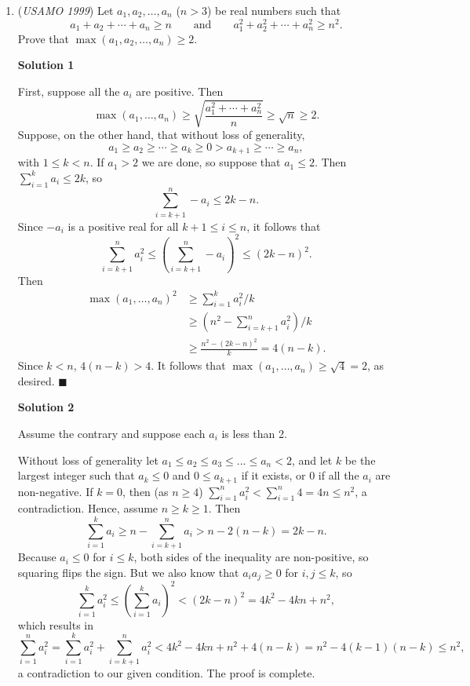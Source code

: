 \begin{enumerate}
 All three possible cases work so we are done.

 (This solution makes absolutely no sense. Why is $k^4\equiv 1$? And how do we know that only $3$ and $5$ work!?)why can't you have a,b,c,d = 2,2,2,4 p = 5 r=1? it doesn't say distinct integers

 


	\item (\textit{USAMO 1999}) Let $a_{1}, a_{2}, \dots, a_{n}$ ($n > 3$) be real numbers such that 
 \[a_{1} + a_{2} + \cdots + a_{n} \geq n \qquad \mbox{and} \qquad a_{1}^{2} + a_{2}^{2} + \cdots + a_{n}^{2} \geq n^{2}.\] Prove that $\max(a_{1}, a_{2}, \dots, a_{n}) \geq 2$.


 



\textbf{Solution 1}

First, suppose all the $a_i$ are positive.  Then
 \[\max(a_1, \dotsc, a_n) \ge \sqrt{\frac{a_1^2 + \dotsb + a_n^2}{n}} \ge \sqrt{n} \ge 2 .\]Suppose, on the other hand, that without loss of generality,
 \[a_1 \ge a_2 \ge \dotsb \ge a_k \ge 0 > a_{k+1} \ge \dotsb \ge a_n,\]with $1\le k <n$.  If $a_1 >2$ we are done, so suppose that $a_1 \le2$.  Then$\sum_{i=1}^k a_i \le 2k$, so 
 \[\sum_{i=k+1}^n -a_i \le 2k-n .\]Since $-a_i$ is a positive real for all $k+1 \le i \le n$, it follows that
 \[\sum_{i=k+1}^n a_i^2 \le \left( \sum_{i=k+1}^n-a_i \right)^2 \le (2k-n)^2 .\]Then
 \begin{align*} \max(a_1, \dotsc, a_n)^2 &\ge \sum_{i=1}^k a_i^2 /k \\ &\ge \left( n^2 - \sum_{i=k+1}^n a_i^2 \right)/k \\ &\ge \frac{n^2 - (2k-n)^2}{k} = 4(n-k). \end{align*}
Since $k<n$, $4(n-k) > 4$.  It follows that $\max(a_1, \dotsc, a_n) \ge \sqrt{4} = 2$, as desired.  $\blacksquare$




\textbf{Solution 2}

Assume the contrary and suppose each $a_i$ is less than 2.

 Without loss of generality let $a_1 \le a_2 \le a_3 \le ... \le a_n < 2$, and let $k$ be the largest integer such that $a_k \le 0$ and $0 \le a_{k+1}$ if it exists, or 0 if all the $a_i$ are non-negative. If $k = 0$, then (as $n \ge 4$) $\sum_{i=1}^n a_i^2 < \sum_{i=1}^n 4 = 4n \le n^2$, a contradiction. Hence, assume $n \ge k \ge 1$. Then
 \[\sum_{i=1}^k a_i \ge n - \sum_{i=k+1}^n a_i > n - 2(n-k) = 2k - n.\]Because $a_i \le 0$ for $i \le k$, both sides of the inequality are non-positive, so squaring flips the sign. But we also know that $a_i a_j \ge 0$ for $i, j \le k$, so
 \[\sum_{i=1}^k a_i^2 \le \left(\sum_{i=1}^k a_i \right)^2 < (2k - n)^2 = 4k^2 - 4kn + n^2,\]which results in
 \[\sum_{i=1}^n a_i^2 = \sum_{i=1}^k a_i^2 + \sum_{i=k+1}^n a_i^2 < 4k^2 - 4kn + n^2 + 4(n-k) = n^2 - 4(k-1)(n-k) \le n^2,\]a contradiction to our given condition. The proof is complete.


\end{enumerate}
